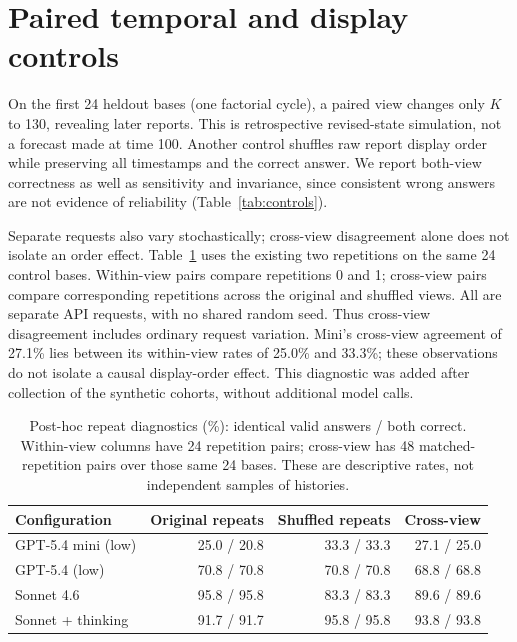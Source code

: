 \section{Paired temporal and display controls}
\label{app:controls}
On the first 24 heldout bases (one factorial cycle), a paired view changes only
$K$ to 130, revealing later reports. This is retrospective revised-state simulation,
not a forecast made at time 100. Another control shuffles raw report display order
while preserving all timestamps and the correct answer. We report both-view
correctness as well as sensitivity and invariance, since consistent wrong answers
are not evidence of reliability (Table~\ref{tab:controls}).

Separate requests also vary stochastically; cross-view disagreement alone does
not isolate an order effect. Table~\ref{tab:repeat} uses the existing two repetitions on the same 24 control
bases. Within-view pairs compare repetitions 0 and 1; cross-view pairs compare
corresponding repetitions across the original and shuffled views. All are
separate API requests, with no shared random seed. Thus cross-view disagreement
includes ordinary request variation. Mini's cross-view agreement of 27.1\%
lies between its within-view rates of 25.0\% and 33.3\%; these observations do
not isolate a causal display-order effect. This diagnostic was added after
collection of the synthetic cohorts, without additional model calls.
\begin{table}[htbp]
\centering\small
\begin{tabular}{lrrr}
\toprule
Configuration & Original repeats & Shuffled repeats & Cross-view \\
\midrule
GPT-5.4 mini (low) & 25.0 / 20.8 & 33.3 / 33.3 & 27.1 / 25.0 \\
GPT-5.4 (low) & 70.8 / 70.8 & 70.8 / 70.8 & 68.8 / 68.8 \\
Sonnet 4.6 & 95.8 / 95.8 & 83.3 / 83.3 & 89.6 / 89.6 \\
Sonnet + thinking & 91.7 / 91.7 & 95.8 / 95.8 & 93.8 / 93.8 \\
\bottomrule
\end{tabular}
\caption{Post-hoc repeat diagnostics (\%): identical valid answers / both correct.
Within-view columns have 24 repetition pairs; cross-view has 48 matched-repetition
pairs over those same 24 bases. These are descriptive rates, not independent
samples of histories.}
\label{tab:repeat}
\end{table}

